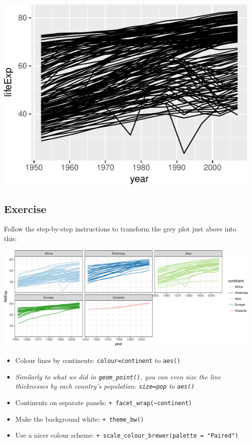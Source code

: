 \documentclass[12pt,]{krantz}
\providecommand{\tightlist}{%
  \setlength{\itemsep}{0pt}\setlength{\parskip}{0pt}}
\theoremstyle{definition}
\theoremstyle{definition}
\theoremstyle{definition}
\theoremstyle{remark}
\begin{document}
\includegraphics{04_plotting_files/figure-latex/unnamed-chunk-5-1.pdf}

\hypertarget{exercise-19}{%
\subsection{Exercise}\label{exercise-19}}

Follow the step-by-step instructions to transform the grey plot just
above into this:

\includegraphics{04_plotting_files/figure-latex/unnamed-chunk-6-1.pdf}

\begin{itemize}
\tightlist
\item
  Colour lines by continents: \texttt{colour=continent} to
  \texttt{aes()}
\item
  \emph{Similarly to what we did in \texttt{geom\_point()}, you can even
  size the line thicknesses by each country's population:
  \texttt{size=pop} to \texttt{aes()}}
\item
  Continents on separate panels:
  \texttt{+\ facet\_wrap(\textasciitilde{}continent)}
\item
  Make the background white: \texttt{+\ theme\_bw()}
\item
  Use a nicer colour scheme:
  \texttt{+\ scale\_colour\_brewer(palette\ =\ "Paired")}
\end{itemize}
\end{document}
